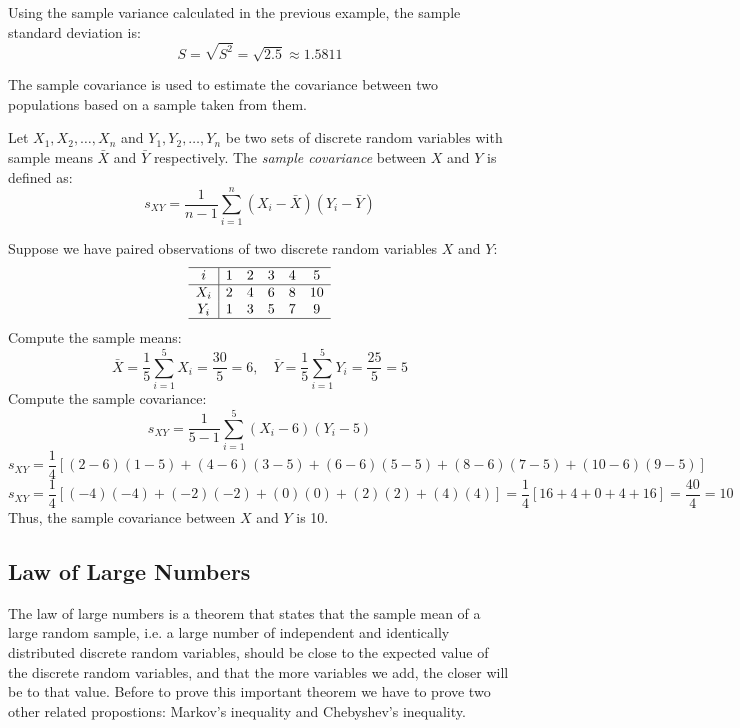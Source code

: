 \begin{example}
Using the sample variance calculated in the previous example, the sample standard deviation is:
\[
S = \sqrt{S^2} = \sqrt{2.5} \approx 1.5811
\]
\end{example}

The sample covariance is used to estimate the covariance between two populations based on a sample taken from them.

\begin{definition}
Let \( X_1, X_2, \ldots, X_n \) and \( Y_1, Y_2, \ldots, Y_n \) be two sets of discrete random variables with sample means \( \bar{X} \) and \( \bar{Y} \) respectively. The \emph{sample covariance} between \( X \) and \( Y \) is defined as:
\[
s_{XY} = \frac{1}{n - 1} \sum_{i=1}^n \left( X_i - \bar{X} \right) \left( Y_i - \bar{Y} \right)
\]
\end{definition}

\begin{example}
Suppose we have paired observations of two discrete random variables \( X \) and \( Y \):
\[
\begin{array}{c|ccccc}
\hline
i & 1 & 2 & 3 & 4 & 5 \\
\hline
X_i & 2 & 4 & 6 & 8 & 10 \\
Y_i & 1 & 3 & 5 & 7 & 9 \\
\hline
\end{array}
\]
Compute the sample means:
\[
\bar{X} = \frac{1}{5} \sum_{i=1}^{5} X_i = \frac{30}{5} = 6, \quad \bar{Y} = \frac{1}{5} \sum_{i=1}^{5} Y_i = \frac{25}{5} = 5
\]
Compute the sample covariance:
\[
s_{XY} = \frac{1}{5 - 1} \sum_{i=1}^{5} \left( X_i - 6 \right) \left( Y_i - 5 \right)
\]
\[
s_{XY} = \frac{1}{4} \left[ (2 - 6)(1 - 5) + (4 - 6)(3 - 5) + (6 - 6)(5 - 5) + (8 - 6)(7 - 5) + (10 - 6)(9 - 5) \right]
\]
\[
s_{XY} = \frac{1}{4} \left[ ( -4 )( -4 ) + ( -2 )( -2 ) + ( 0 )( 0 ) + ( 2 )( 2 ) + ( 4 )( 4 ) \right] = \frac{1}{4} \left[ 16 + 4 + 0 + 4 + 16 \right] = \frac{40}{4} = 10
\]
Thus, the sample covariance between \( X \) and \( Y \) is 10.
\end{example}


\subsection{Law of Large Numbers}

The law of large numbers is a theorem that states that the sample mean of a large random sample, i.e. a large number of independent and identically distributed discrete random variables, should be close to the expected value of the discrete random variables, and that the more variables we add, the closer will be to that value. Before to prove this important theorem we have to prove two other related propostions: Markov's inequality and Chebyshev's inequality.

